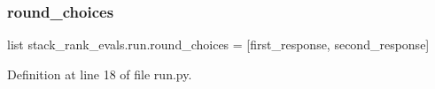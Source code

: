 \subsubsection{\texorpdfstring{round\+\_\+choices}{round\_choices}}
{\footnotesize\ttfamily list stack\+\_\+rank\+\_\+evals.\+run.\+round\+\_\+choices = \mbox{[}\textquotesingle{}first\+\_\+response\textquotesingle{}, \textquotesingle{}second\+\_\+response\textquotesingle{}\mbox{]}}



Definition at line 18 of file run.\+py.


